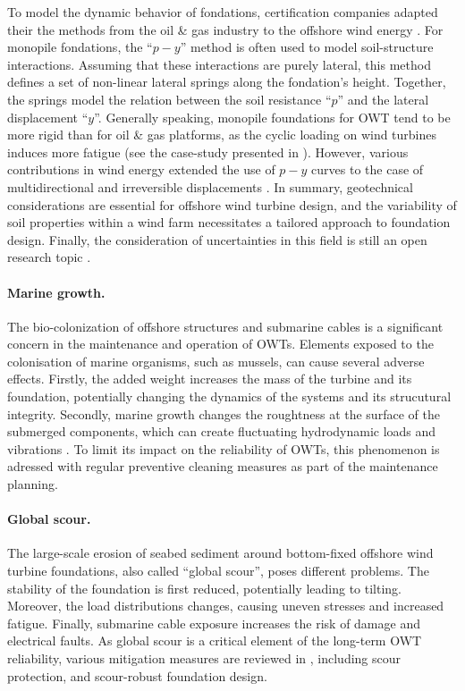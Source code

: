 To model the dynamic behavior of fondations, certification companies adapted their the methods from the oil \& gas industry to the offshore wind energy \citep{dnv_2018_soil}. 
For monopile fondations, the ``$p-y$'' method is often used to model soil-structure interactions. 
Assuming that these interactions are purely lateral, this method defines a set of non-linear lateral springs along the fondation's height.  
Together, the springs model the relation between the soil resistance ``$p$'' and the lateral displacement ``$y$''. 
Generally speaking, monopile foundations for OWT tend to be more rigid than for oil \& gas platforms, as the cyclic loading on wind turbines induces more fatigue (see the case-study presented in \citet{le_2014_geotech_casestudy}).  
However, various contributions in wind energy extended the use of $p-y$ curves to the case of multidirectional and irreversible displacements \citep{lovera_2019_thesis}. 
In summary, geotechnical considerations are essential for offshore wind turbine design, and the variability of soil properties within a wind farm necessitates a tailored approach to foundation design. 
Finally, the consideration of uncertainties in this field is still an open research topic \citep{reale_2021_OWT_soil_uncertainties}.


\paragraph{Marine growth.}
The bio-colonization of offshore structures and submarine cables is a significant concern in the maintenance and operation of OWTs. 
Elements exposed to the colonisation of marine organisms, such as mussels, can cause several adverse effects. 
Firstly, the added weight increases the mass of the turbine and its foundation, potentially changing the dynamics of the systems and its strucutural integrity. \citep{ameryoun_2019_marine_growth,schoefs_2022_reliability_marine_growth}
Secondly, marine growth changes the roughtness at the surface of the submerged components, which can create fluctuating hydrodynamic loads and vibrations \citep{marty_2021_cable_marine_growth}. 
To limit its impact on the reliability of OWTs, this phenomenon is adressed with regular preventive cleaning measures as part of the maintenance planning. 


\paragraph{Global scour.}
The large-scale erosion of seabed sediment around bottom-fixed offshore wind turbine foundations, also called ``global scour'', poses different problems. 
The stability of the foundation is first reduced, potentially leading to tilting. 
Moreover, the load distributions changes, causing uneven stresses and increased fatigue. 
Finally, submarine cable exposure increases the risk of damage and electrical faults. 
As global scour is a critical element of the long-term OWT reliability, various mitigation measures are reviewed in \citet{fazeres_2021_scour}, including scour protection, and scour-robust foundation design.



